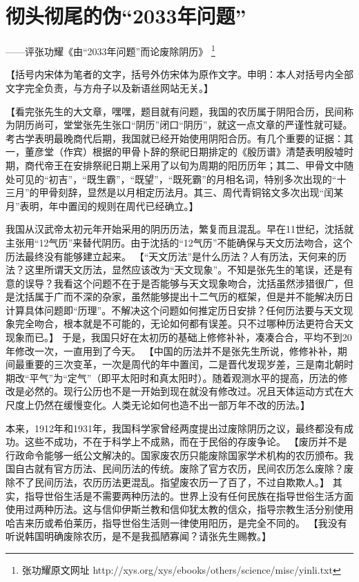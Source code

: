 \section{彻头彻尾的伪“2033年问题”}
\centerline{
	\yuesong ——评张功耀《由“2033年问题”而论废除阴历》
	\footnote{张功耀原文网址 http://xys.org/xys/ebooks/others/science/misc/yinli.txt}
}

\mbox{}

【括号内宋体为笔者的文字，括号外仿宋体为原作文字。申明：本人对括号内全部文字完全负责，与方舟子以及新语丝网站无关。】

【看完张先生的大文章，嘿嘿，题目就有问题，我国的农历属于阴阳合历，民间称为阴历尚可，堂堂张先生张口“阴历”闭口“阴历”，就这一点文章的严谨性就可疑。考古学表明最晚商代后期，我国就已经开始使用阴阳合历。有几个重要的证据：其一，董彦堂（作宾）根据的甲骨卜辞的祭祀日期排定的《殷历谱》清楚表明殷墟时期，商代帝王在安排祭祀日期上采用了以旬为周期的阳历历年；其二、甲骨文中随处可见的“初吉”，“既生霸”，“既望”，“既死霸”的月相名词，特别多次出现的“十三月”的甲骨刻辞，显然是以月相定历法月。其三、周代青铜铭文多次出现“闰某月”表明，年中置闰的规则在周代已经确立。】

\fangsong 我国从汉武帝太初元年开始采用的阴历历法，繁复而且混乱。早在11世纪，沈括就主张用“12气历”来替代阴历。由于沈括的“12气历”不能确保与天文历法吻合，这个历法最终没有能够建立起来。
\normalfont
【“天文历法”是什么历法？人有历法，天何来的历法？这里所谓天文历法，显然应该改为“天文现象”。不知是张先生的笔误，还是有意的误导？我看这个问题不在于是否能够与天文现象吻合，沈括虽然涉猎很广，但是沈括属于广而不深的杂家，虽然能够提出十二气历的框架，但是并不能解决历日计算具体问题即“历理”。不解决这个问题如何推定历日安排？任何历法要与天文现象完全吻合，根本就是不可能的，无论如何都有误差。只不过哪种历法更符合天文现象而已。】
\fangsong
于是，我国只好在太初历的基础上修修补补，凑凑合合，平均不到20年修改一次，一直用到了今天。
\normalfont
【中国的历法并不是张先生所说，修修补补，期间最重要的三次变革，一次是周代的年中置闰，二是晋代发现岁差，三是南北朝时期改“平气”为“定气”（即平太阳时和真太阳时）。随着观测水平的提高，历法的修改是必然的。现行公历也不是一开始到现在就没有修改过。况且天体运动方式在大尺度上仍然在缓慢变化。人类无论如何也造不出一部万年不改的历法。】

\fangsong
本来，1912年和1931年，我国科学家曾经两度提出过废除阴历之议，最终都没有成功。这些不成功，不在于科学上不成熟，而在于民俗的存废争论。
\normalfont
【废历并不是行政命令能够一纸公文解决的。国家废农历只能废除国家学术机构的农历颁布。我国自古就有官方历法、民间历法的传统。废除了官方农历，民间农历怎么废除？废除不了民间历法，农历历法更混乱。指望废农历一了百了，不过自欺欺人。】
\fangsong
其实，指导世俗生活是不需要两种历法的。世界上没有任何民族在指导世俗生活方面使用过两种历法。这与信仰伊斯兰教和信仰犹太教的信众，指导宗教生活分别使用哈吉来历或希伯莱历，指导世俗生活则一律使用阳历，是完全不同的。
\normalfont
【我没有听说韩国明确废除农历，是不是我孤陋寡闻？请张先生赐教。】

